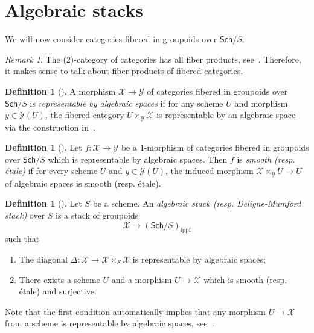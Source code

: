 \documentclass{amsart}
\theoremstyle{definition}
\newtheorem{defn}[thm]{Definition}
\theoremstyle{remark}
\newtheorem{rmk}[thm]{Remark}
\theoremstyle{plain}
\theoremstyle{definition}
\theoremstyle{remark}
\newcommand{\mc}[1]{\mathcal{#1}}
\newcommand{\mr}[1]{\mathrm{#1}}
\newcommand{\ms}[1]{\mathsf{#1}}
\newcommand{\1}{\mathbf{1}}
\newcommand{\2}{\mathbf{2}}
\newcommand{\3}{\mathbf{3}}
\newcommand{\Sch}{\ms{Sch}}
\newcommand{\fppf}{\mr{fppf}}
\begin{document}
\section{Algebraic stacks}

We will now consider categories fibered in groupoids over $\ms{Sch}/S$.

\begin{rmk}
    The ($2$)-category of categories has all fiber products, see~\cite[\href{https://stacks.math.columbia.edu/tag/02X9}{Tag 02X9}]{stacks}. Therefore, it makes sense to talk about fiber products of fibered categories.
\end{rmk}

\begin{defn}[{\cite[\href{https://stacks.math.columbia.edu/tag/02ZW}{Tag 02ZW}]{stacks}}]
    A morphism $\mc{X} \to \mc{Y}$ of categories fibered in groupoids over $\Sch/S$ is \textit{representable by algebraic spaces} if for any scheme $U$ and morphism $y \in \mc{Y}(U)$, the fibered category $U \times_{\mc{Y}} \mc{X}$ is representable by an algebraic space via the construction in~.
\end{defn}

\begin{defn}[{\cite[\href{https://stacks.math.columbia.edu/tag/03YK}{Tag 03YK}, \href{https://stacks.math.columbia.edu/tag/0429}{Tag 0429}, \href{https://stacks.math.columbia.edu/tag/042B}{Tag 042B}]{stacks}}]
    Let $f \colon \mc{X} \to \mc{Y}$ be a $1$-morphism of categories fibered in groupoids over $\Sch/S$ which is representable by algebraic spaces. Then $f$ is \textit{smooth (resp. \'etale)} if for every scheme $U$ and $y \in \mc{Y}(U)$, the induced morphism $\mc{X} \times_{\mc{Y}} U \to U$ of algebraic spaces is smooth (resp. \'etale).
\end{defn}



\begin{defn}[{\cite[\href{https://stacks.math.columbia.edu/tag/026O}{Tag 026O}]{stacks}}]
    Let $S$ be a scheme. An \textit{algebraic stack (resp. Deligne-Mumford stack)} over $S$ is a stack of groupoids
    \[ \mc{X} \to (\Sch/S)_{\fppf} \]
    such that
    \begin{enumerate}
        \item The diagonal $\Delta \colon \mc{X} \to \mc{X} \times_S \mc{X}$ is representable by algebraic spaces;
        \item There exists a scheme $U$ and a morphism $U \to \mc{X}$ which is smooth (resp. \'etale) and surjective.
    \end{enumerate}
    Note that the first condition automatically implies that any morphism $U \to \mc{X}$ from a scheme is representable by algebraic spaces, see~\cite[\href{https://stacks.math.columbia.edu/tag/045G}{Tag 045G}]{stacks}.
\end{defn}



\printbibliography
\end{document}
